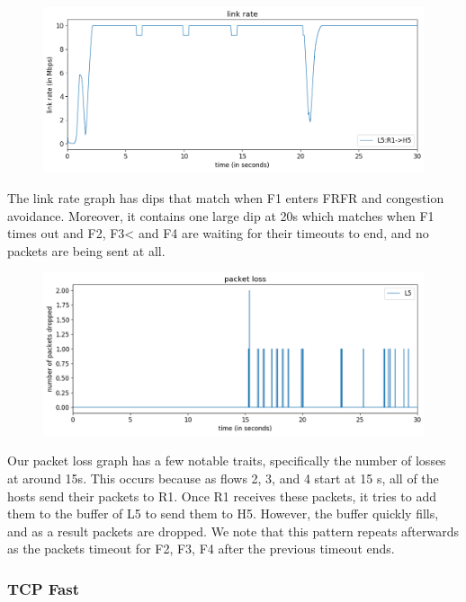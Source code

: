 \documentclass{article}
\begin{document}
\begin{figure}[H]
\centering
\includegraphics[width = \textwidth]{test_case5_reno link rate.png}
\end{figure}


The link rate graph has dips that match when F1 enters FRFR and congestion avoidance. Moreover, it contains one large dip at 20s which matches when F1 times out and F2, F3< and F4 are waiting for their timeouts to end, and no packets are being sent at all.

\begin{figure}[H]
\centering
\includegraphics[width = \textwidth]{test_case5_reno packet loss.png}
\end{figure}


Our packet loss graph has a few notable traits, specifically the number of losses at around 15s. This occurs because as flows 2, 3, and 4 start at 15 s, all of the hosts send their packets to R1. Once R1 receives these packets, it tries to add them to the buffer of L5 to send them to H5. However, the buffer quickly fills, and as a result packets are dropped. We note that this pattern repeats afterwards as the packets timeout for F2, F3, F4 after the previous timeout ends.

\subsubsection{TCP Fast}
\end{document}
